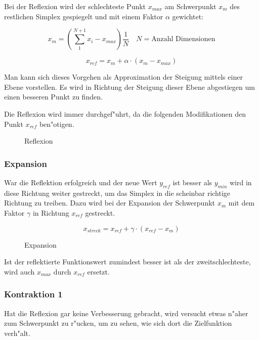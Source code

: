 Bei der Reflexion wird der schlechteste Punkt $x_{max}$ am Schwerpunkt $x_m$ des restlichen Simplex gespiegelt und mit einem Faktor $\alpha$ gewichtet:

\begin{equation}
x_m = \left(\sum_1^{N+1} x_i - x_{max}\right) \frac{1}{N} \quad N = \text{Anzahl Dimensionen}
\end{equation}

\begin{equation}
x_{ref} = x_m + \alpha \cdot (x_m-x_{max})
\end{equation}

Man kann sich dieses Vorgehen als Approximation der Steigung mittels einer Ebene vorstellen.
Es wird in Richtung der Steigung dieser Ebene abgestiegen um einen besseren Punkt zu finden.

Die Reflexion wird immer durchgef"uhrt, da die folgenden Modifikationen den Punkt $x_{ref}$ ben"otigen.

\begin{figure}[h]
	\centering
  	\caption{Reflexion}%
	\label{fig:Reflexion}%
\end{figure}

\subsubsection{Expansion}
War die Reflektion erfolgreich und der neue Wert $y_{ref}$ ist besser als $y_{min}$ wird in diese Richtung weiter gestreckt, um das Simplex in die scheinbar richtige Richtung zu treiben.
Dazu wird bei der Expansion der Schwerpunkt $x_m$ mit dem Faktor $\gamma$ in Richtung $x_{ref}$ gestreckt.

\begin{equation}
x_{streck} = x_{ref} + \gamma \cdot (x_{ref}-x_{m})
\end{equation}
\begin{figure}[h]
	\centering
  	\caption{Expansion}%
	\label{fig:Streckung}%
\end{figure}

Ist der reflektierte Funktionswert zumindest besser ist als der zweitschlechteste, wird auch $x_{max}$ durch $x_{ref}$ ersetzt.


\subsubsection{Kontraktion 1}

Hat die Reflexion gar keine Verbesserung gebracht, wird versucht etwas n"aher zum Schwerpunkt zu r"ucken, um zu sehen, wie sich dort die Zielfunktion verh"alt.

